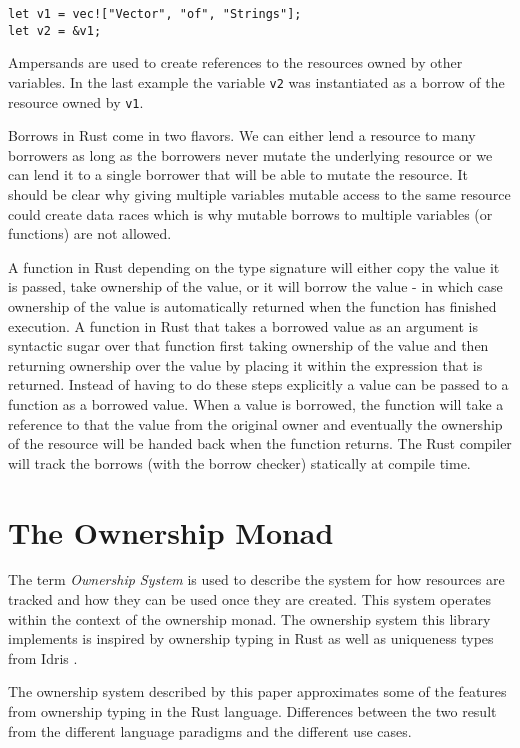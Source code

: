 \documentclass[onehalf,11pt]{beavtex}
\begin{document}
\begin{verbatim}
let v1 = vec!["Vector", "of", "Strings"];
let v2 = &v1;
\end{verbatim}

Ampersands are used to create references to the resources owned by other
variables.
In the last example the variable \texttt{v2} was instantiated as a borrow
of the resource owned by \texttt{v1}.

Borrows in Rust come in two flavors. We can either lend a resource to many
borrowers as long as the borrowers never mutate the underlying resource or we
can lend it to a single borrower that will be able to mutate the
resource.\cite{rust_book_borrowing}
It should be clear why giving multiple variables mutable access to
the same resource could create data races which is why mutable borrows to
multiple variables (or functions) are not allowed.

A function in Rust depending on the type signature will either copy the value
it is passed, take ownership of the value, or it will borrow the value - in
which case ownership of the value is automatically returned when the function
has finished execution.\cite{rust_book_ownership}
A function in Rust that takes a borrowed value as an argument is
syntactic sugar over that function first taking ownership of the value and then
returning ownership over the value by placing it within the expression that is
returned.
Instead of having to do these steps explicitly a value can be passed to a
function as a borrowed value.  When a value is borrowed, the function will take
a reference to that the value from the original owner and eventually the
ownership of the resource will be handed back when the function returns.
The Rust compiler will track the borrows (with the borrow checker) statically at
compile time.

\chapter{The Ownership Monad}

The term \textit{Ownership System} is used to describe the system for how
resources are tracked and how they can be used once they are created. This
system operates within the context of the ownership monad.
The ownership system this library implements is inspired by
ownership typing in Rust \cite{rust_book_ownership}
as well as uniqueness types from Idris \cite{idris_uniqueness_types}.

The ownership system described by this paper approximates some of the
features from ownership typing in the Rust language. Differences between
the two result from the different language paradigms and the different use
cases.
\end{document}
